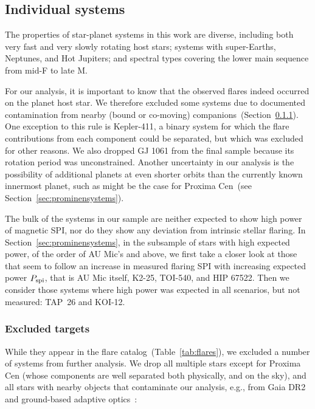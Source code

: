 \documentclass[twocolumn]{aastex631}
\begin{document}
\subsection{Individual systems}
\label{sec:results:individualstars}
The properties of star-planet systems in this work are diverse, including both very fast and very slowly rotating host stars; systems with super-Earths, Neptunes, and Hot Jupiters; and spectral types covering the lower main sequence from mid-F to late M. 

For our analysis, it is important to know that the observed flares indeed occurred on the planet host star. We therefore excluded some systems due to documented contamination from nearby (bound or co-moving) companions~(Section~\ref{sec:results:individualstars:excluded}). One exception to this rule is Kepler-411, a binary system for which the flare contributions from each component could be separated, but which was excluded for other reasons. We also dropped GJ 1061 from the final sample because its rotation period was unconstrained. Another uncertainty in our analysis is the possibility of additional planets at even shorter orbits than the currently known innermost planet, such as might be the case for Proxima Cen~(see Section~\ref{sec:prominensystems}). 

The bulk of the systems in our sample are neither expected to show high power of magnetic SPI, nor do they show any deviation from intrinsic stellar flaring. In Section~\ref{sec:prominensystems}, in the subsample of stars with high expected power, of the order of AU Mic's and above, we first take a closer look at those that seem to follow an increase in measured flaring SPI with increasing expected power $P_{\rm spi}$, that is AU Mic itself, K2-25, TOI-540, and HIP 67522. Then we consider those systems where high power was expected in all scenarios, but not measured: TAP~26 and KOI-12.
\subsubsection{Excluded targets}
\label{sec:results:individualstars:excluded}

While they appear in the flare catalog~(Table~\ref{tab:flares}), we excluded a number of systems from further analysis. We drop all multiple stars except for Proxima Cen (whose components are well separated both physically, and on the sky), and all stars with nearby objects that contaminate our analysis, e.g., from Gaia DR2 and ground-based adaptive optics~\citep{ziegler2018measuring}: 
\end{document}
